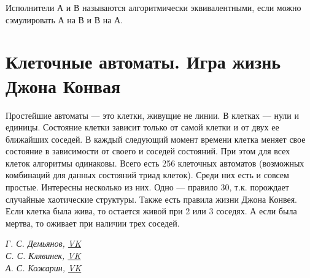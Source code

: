 \documentclass[a4paper,12pt]{article}
\theoremstyle{plain} %
\theoremstyle{definition} %
\theoremstyle{remark} %
\begin{document}
Исполнители А и В называются алгоритмически эквивалентными, если можно сэмулировать А на В и В на А.

\section{Клеточные автоматы. Игра жизнь Джона Конвая}
Простейшие автоматы --- это клетки, живущие не линии. В клетках --- нули и единицы. Состояние клетки зависит только от самой клетки и от двух ее ближайших соседей. В каждый следующий момент времени клетка меняет свое состояние в зависимости от своего и соседей состояний. При этом для всех клеток алгоритмы одинаковы. Всего есть 256 клеточных автоматов (возможных комбинаций для данных состояний триад клеток). Среди них есть и совсем простые. Интересны несколько из них. Одно --- правило 30, т.к. порождает случайные хаотические структуры. Также есть правила жизни Джона Конвея. Если клетка была жива, то остается живой при 2 или 3 соседях. А если была мертва, то оживает при наличии трех соседей.






























\begin{center}
	\vfill \emph{{\small Г. С. Демьянов, \href{https://vk.com/id37346992}{VK}\\
С. С. Клявинек, \href{https://vk.com/id85132547}{VK}\\
А. С. Кожарин, \href{https://vk.com/id92540660}{VK}
}}
\end{center}
\end{document}

